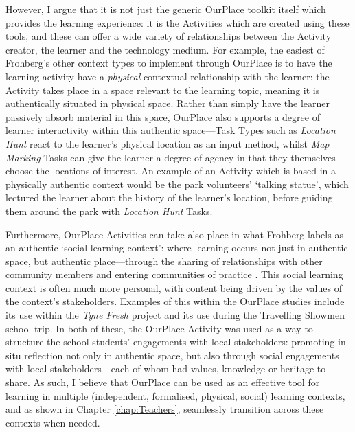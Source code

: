However, I argue that it is not just the generic OurPlace toolkit itself which provides the learning experience: it is the Activities which are created using these tools, and these can offer a wide variety of relationships between the Activity creator, the learner and the technology medium. For example, the easiest of Frohberg's other context types to implement through OurPlace is to have the learning activity have a \textit{physical} contextual relationship with the learner: the Activity takes place in a space relevant to the learning topic, meaning it is authentically situated in physical space. Rather than simply have the learner passively absorb material in this space, OurPlace also supports a degree of learner interactivity within this authentic space---Task Types such as \textit{Location Hunt} react to the learner's physical location as an input method, whilst \textit{Map Marking} Tasks can give the learner a degree of agency in that they themselves choose the locations of interest. An example of an Activity which is based in a physically authentic context would be the park volunteers' `talking statue', which lectured the learner about the history of the learner's location, before guiding them around the park with \textit{Location Hunt} Tasks.

Furthermore, OurPlace Activities can take also place in what Frohberg labels as an authentic `social learning context': where learning occurs not just in authentic space, but authentic place---through the sharing of relationships with other community members and entering communities of practice \citep{lave1991situated}. This social learning context is often much more personal, with content being driven by the values of the context's stakeholders. Examples of this within the OurPlace studies include its use within the \textit{Tyne Fresh} project and its use during the Travelling Showmen school trip. In both of these, the OurPlace Activity was used as a way to structure the school students' engagements with local stakeholders: promoting in-situ reflection not only in authentic space, but also through social engagements with local stakeholders---each of whom had values, knowledge or heritage to share. As such, I believe that OurPlace can be used as an effective tool for learning in multiple (independent, formalised, physical, social) learning contexts, and as shown in Chapter \ref{chap:Teachers}, seamlessly transition across these contexts when needed.


